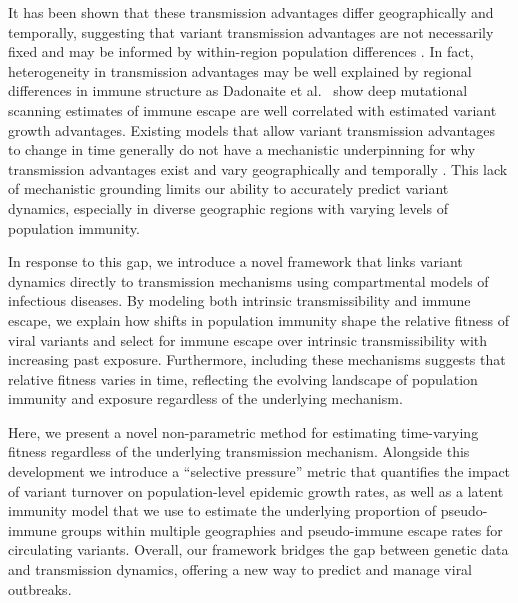 \documentclass[11pt,oneside,letterpaper]{article}
\begin{document}
It has been shown that these transmission advantages differ geographically and temporally, suggesting that variant transmission advantages are not necessarily fixed and may be informed by within-region population differences \cite{figgins2022sars, vanDorp2022}.
In fact, heterogeneity in transmission advantages may be well explained by regional differences in immune structure as Dadonaite et al.\ \cite{Dadonaite2023} show deep mutational scanning estimates of immune escape are well correlated with estimated variant growth advantages.
Existing models that allow variant transmission advantages to change in time generally do not have a mechanistic underpinning for why transmission advantages exist and vary geographically and temporally \cite{figgins2022sars, susswein2023leveraging}.
This lack of mechanistic grounding limits our ability to accurately predict variant dynamics, especially in diverse geographic regions with varying levels of population immunity.

In response to this gap, we introduce a novel framework that links variant dynamics directly to transmission mechanisms using compartmental models of infectious diseases.
By modeling both intrinsic transmissibility and immune escape, we explain how shifts in population immunity shape the relative fitness of viral variants and select for immune escape over intrinsic transmissibility with increasing past exposure.
Furthermore, including these mechanisms suggests that relative fitness varies in time, reflecting the evolving landscape of population immunity and exposure regardless of the underlying mechanism.

Here, we present a novel non-parametric method for estimating time-varying fitness regardless of the underlying transmission mechanism.
Alongside this development we introduce a ``selective pressure'' metric that quantifies the impact of variant turnover on population-level epidemic growth rates, as well as a latent immunity model that we use to estimate the underlying proportion of pseudo-immune groups within multiple geographies and pseudo-immune escape rates for circulating variants.
Overall, our framework bridges the gap between genetic data and transmission dynamics, offering a new way to predict and manage viral outbreaks.
\end{document}
